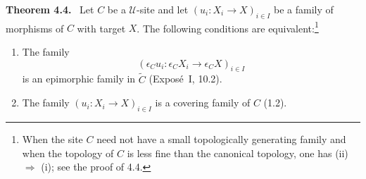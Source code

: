 \documentclass[11pt]{article}
\newcommand{\U}{\mathcal{U}}
\newenvironment{statement}[1]{\par\medskip\noindent\textbf{#1.}\ }{\par\medskip}
\begin{document}
\begin{statement}{Theorem 4.4}
Let \(C\) be a \(\U\)-site and let \((u_i:X_i\to X)_{i\in I}\) be a family of morphisms of \(C\) with target \(X\). The following conditions are equivalent:\footnote{When the site \(C\) need not have a small topologically generating family and when the topology of \(C\) is less fine than the canonical topology, one has (ii) \(\Rightarrow\) (i); see the proof of 4.4.}
\begin{enumerate}[label=(\roman*)]
\item The family
\[
(\epsilon_Cu_i:\epsilon_CX_i\to \epsilon_CX)_{i\in I}
\]
is an epimorphic family in \(\widetilde C\) (Expos\'e~I, 10.2).
\item The family \((u_i:X_i\to X)_{i\in I}\) is a covering family of \(C\) (1.2).
\end{enumerate}
\end{statement}
\end{document}
